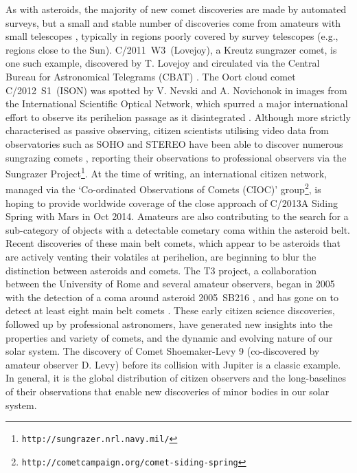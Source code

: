 \documentclass{ar2e}
\def\url#1{\texttt{#1}}
\begin{document}
As with asteroids, the majority of new comet discoveries are made by automated
surveys, but a small and stable number of discoveries come from amateurs with
small telescopes \citep{14mousis_proam}, typically in regions poorly covered by survey telescopes
(e.g., regions close to the Sun).   C/2011~W3~(Lovejoy), a Kreutz sungrazer
comet, is one such example, discovered by T. Lovejoy and circulated via the
Central Bureau for Astronomical Telegrams (CBAT) \citep[e.g.,][]{12sekanina}. 
The Oort cloud comet C/2012~S1~(ISON) was spotted by V. Nevski and A. Novichonok
in images from the International Scientific Optical Network, which spurred a
major international effort to observe its perihelion passage as it disintegrated
\citep{14sekanina}.  Although more strictly characterised as passive observing, citizen 
scientists utilising video data from observatories such as SOHO and STEREO have 
been able to discover numerous sungrazing comets \citep[indeed, the majority of 
2000+ SOHO sungrazer discoveries have been due to dedicated amateurs over 
15+ years of operation, e.g.,][]{12battams}, reporting their observations to professional 
observers via the Sungrazer Project\footnote{\url{http://sungrazer.nrl.navy.mil/}}.  
At the time of writing, an international citizen network, managed via the `Co-ordinated 
Observations of Comets (CIOC)'  group\footnote{\url{http://cometcampaign.org/comet-siding-spring}}, 
is hoping to provide worldwide coverage of the close approach of C/2013A Siding 
Spring with Mars in Oct 2014.  Amateurs are also contributing to the search for a
sub-category of objects with a detectable cometary coma within the asteroid
belt.  Recent discoveries of these main belt comets, which appear to be
asteroids that are actively venting their volatiles at perihelion, are beginning
to blur the distinction between asteroids and comets.  The T3 project, a
collaboration between the University of Rome and several amateur observers,
began in 2005 with the detection of a coma around asteroid 2005~SB216
\citep{06buzzi}, and has gone on to detect at least eight main belt comets
\citep{14mousis_proam}.  These early citizen science discoveries, followed up by
professional astronomers, have generated new insights into the properties and
variety of comets, and the dynamic and evolving nature of our solar system.  The
discovery of Comet Shoemaker-Levy 9 (co-discovered by amateur observer D. Levy)
before its collision with Jupiter \citep{04harrington} is a classic example.
In general, it is the global distribution of citizen observers and the
long-baselines of their observations that enable new discoveries of minor bodies
in our solar system.
\end{document}

